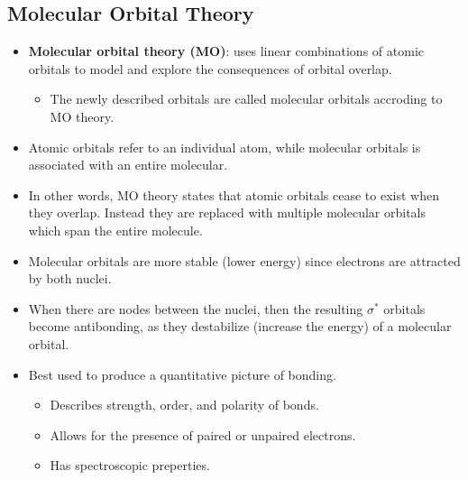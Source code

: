 \documentclass[12pt,a4paper]{article}
\begin{document}
\subsection{Molecular Orbital Theory}
\begin{itemize}
    \item \textbf{Molecular orbital theory (MO)}: uses linear combinations of atomic orbitals to model and explore the consequences of orbital overlap.
        \begin{itemize}
            \item The newly described orbitals are called {\color{o-Sun}molecular orbitals} accroding to MO theory.
        \end{itemize}
    \item Atomic orbitals refer to an individual atom, while molecular orbitals is associated with an entire molecular.
    \item In other words, MO theory states that atomic orbitals cease to exist when they overlap. Instead they are replaced with multiple molecular orbitals which span the entire molecule.
    \item Molecular orbitals are more stable (lower energy) since electrons are attracted by both nuclei.
    \item When there are {\color{o-Sun}nodes} between the nuclei, then the resulting $\sigma^*$ orbitals become {\color{o-Sun}antibonding}, as they {\color{o-Sun}destabilize} (increase the energy) of a molecular orbital.
    \item Best used to produce a quantitative picture of bonding.
        \begin{itemize}
            \item Describes strength, order, and polarity of bonds.
            \item Allows for the presence of paired or unpaired electrons.
            \item Has spectroscopic preperties.
        \end{itemize}
\end{itemize}
\end{document}
